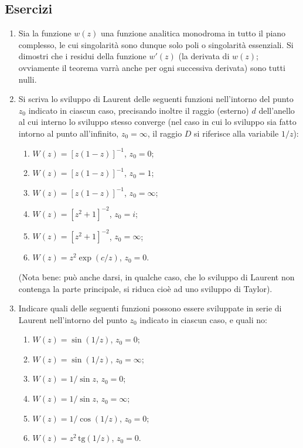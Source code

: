 \documentclass[11pt, a4paper]{book}
\numberwithin{equation}{section}
\newenvironment{esercizi}{\subsection*{Esercizi}\begin{enumerate}}{\end{enumerate}}
\begin{document}
\begin{esercizi}
\item Sia la funzione $w(z)$ una funzione analitica monodroma in tutto il piano complesso, le cui singolarità sono dunque solo poli o singolarità essenziali. Si dimostri che i residui della funzione $w'(z)$ (la derivata di $w(z)$; ovviamente il teorema varrà anche per ogni successiva derivata) sono tutti nulli.

\item Si scriva lo sviluppo di Laurent delle seguenti funzioni nell'intorno del punto $z_0$ indicato in ciascun caso, precisando inoltre il raggio (esterno) $d$ dell'anello al cui interno lo sviluppo stesso converge (nel caso in cui lo sviluppo sia fatto intorno al punto all'infinito, $z_0 = \infty$, il raggio $D$ si riferisce alla variabile $1/z$):
\begin{enumerate}
\item[i)] $W(z) = \left[z(1-z)\right]^{-1}$, \quad $z_0 = 0$;
\item[ii)] $W(z) = \left[z(1-z)\right]^{-1}$, \quad $z_0 = 1$;
\item[iii)] $W(z) = \left[z(1-z)\right]^{-1}$, \quad $z_0 = \infty$;
\item[iv)] $W(z) = \left[z^2+1\right]^{-2}$, \quad $z_0 = i$;
\item[v)] $W(z) = \left[z^2+1\right]^{-2}$, \quad $z_0 = \infty$;
\item[vi)] $W(z) = z^2 \exp(c/z)$, \quad $z_0 = 0$.
\end{enumerate}
(Nota bene: può anche darsi, in qualche caso, che lo sviluppo di Laurent non contenga la parte principale, si riduca cioè ad uno sviluppo di Taylor).

\item Indicare quali delle seguenti funzioni possono essere sviluppate in serie di Laurent nell'intorno del punto $z_0$ indicato in ciascun caso, e quali no:
\begin{enumerate}
\item[i)] $W(z) = \sin(1/z)$, \quad $z_0 = 0$;
\item[ii)] $W(z) = \sin(1/z)$, \quad $z_0 = \infty$;
\item[iii)] $W(z) = 1/\sin z$, \quad $z_0 = 0$;
\item[iv)] $W(z) = 1/\sin z$, \quad $z_0 = \infty$;
\item[v)] $W(z) = 1/\cos(1/z)$, \quad $z_0 = 0$;
\item[vi)] $W(z) = z^2\,\mathrm{tg}(1/z)$, \quad $z_0 = 0$.
\end{enumerate}


\end{esercizi}
\end{document}
